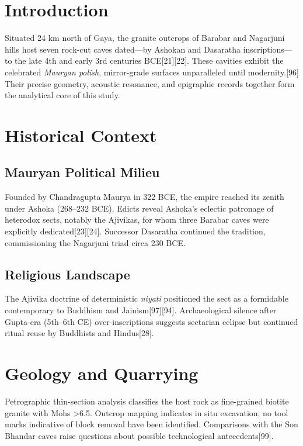 \documentclass{article}
\begin{document}
\begin{multicols}{2}
\section{Introduction}
Situated 24 km north of Gaya, the granite outcrops of Barabar and Nagarjuni hills host seven rock-cut caves dated—by Ashokan and Dasaratha inscriptions—to the late 4th and early 3rd centuries BCE[21][22]. These cavities exhibit the celebrated \emph{Mauryan polish}, mirror-grade surfaces unparalleled until modernity.[96] Their precise geometry, acoustic resonance, and epigraphic records together form the analytical core of this study.
\section{Historical Context}
\subsection{Mauryan Political Milieu}
Founded by Chandragupta Maurya in 322 BCE, the empire reached its zenith under Ashoka (268–232 BCE). Edicts reveal Ashoka’s eclectic patronage of heterodox sects, notably the Ajivikas, for whom three Barabar caves were explicitly dedicated[23][24]. Successor Dasaratha continued the tradition, commissioning the Nagarjuni triad circa 230 BCE.
\subsection{Religious Landscape}
The Ajivika doctrine of deterministic \textit{niyati} positioned the sect as a formidable contemporary to Buddhism and Jainism[97][94]. Archaeological silence after Gupta-era (5th–6th CE) over-inscriptions suggests sectarian eclipse but continued ritual reuse by Buddhists and Hindus[28].
\section{Geology and Quarrying}
Petrographic thin-section analysis classifies the host rock as fine-grained biotite granite with Mohs \textgreater 6.5. Outcrop mapping indicates in situ excavation; no tool marks indicative of block removal have been identified. Comparisons with the Son Bhandar caves raise questions about possible technological antecedents[99].

\end{multicols}
\end{document}
